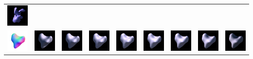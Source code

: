 \begin{center}
\begin{longtable}{@{}c@{}c@{}c@{}c@{}c@{}c@{}c@{}c@{}c@{}}
\includegraphics[width=0.1\linewidth]{training/6_7.png} \\
\includegraphics[width=0.1\linewidth]{training/7_gt.png} & \includegraphics[width=0.1\linewidth]{training/7_0.png} &
\includegraphics[width=0.1\linewidth]{training/7_1.png} & \includegraphics[width=0.1\linewidth]{training/7_2.png} &
\includegraphics[width=0.1\linewidth]{training/7_3.png} & \includegraphics[width=0.1\linewidth]{training/7_4.png} &
\includegraphics[width=0.1\linewidth]{training/7_5.png} & \includegraphics[width=0.1\linewidth]{training/7_6.png} &
\includegraphics[width=0.1\linewidth]{training/7_7.png} \\

\end{longtable}
\end{center}
